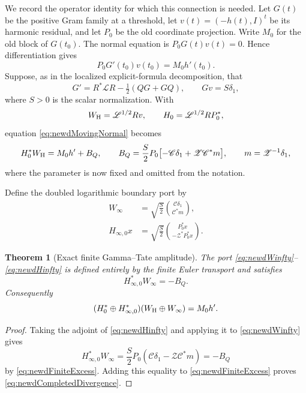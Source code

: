 \documentclass[11pt]{amsart}
\newtheorem{theorem}{Theorem}[section]
\theoremstyle{definition}
\theoremstyle{remark}
\begin{document}
We record the operator identity for which this connection is needed.  Let
$G(t)$ be the positive Gram family at a threshold, let
$v(t)=(-h(t),I)^t$ be its harmonic residual, and let $P_0$ be the old
coordinate projection.  Write $M_0$ for the old block of $G(t_0)$.  The
normal equation is $P_0G(t)v(t)=0$.  Hence differentiation gives
\begin{equation}\label{eq:newdMovingNormal}
 P_0G'(t_0)v(t_0)=M_0h'(t_0).
\end{equation}
Suppose, as in the localized explicit-formula decomposition, that
\[
 G'=R^*\mathscr LR-\tfrac12(QG+GQ),
 \qquad Gv=S\delta_1,
\]
where $S>0$ is the scalar normalization.  With
\[
 W_{\rm H}=\mathscr L^{1/2}Rv,
 \qquad H_0=\mathscr L^{1/2}RP_0^*,
\]
equation \eqref{eq:newdMovingNormal} becomes
\begin{equation}\label{eq:newdFiniteExcess}
 H_0^*W_{\rm H}=M_0h'+B_Q,
 \qquad
 B_Q=\frac S2P_0
 \bigl[-\mathscr C\delta_1+\mathscr Z\mathscr C^*m\bigr],
 \qquad m=\mathscr Z^{-1}\delta_1,
\end{equation}
where the parameter is now fixed and omitted from the notation.

Define the doubled logarithmic boundary port by
\begin{align}
 W_\infty
 &=\sqrt{\frac S2}
   \binom{\mathscr C\delta_1}{\mathscr C^*m},
   \label{eq:newdWinfty}\\
 H_{\infty,0}x
 &=\sqrt{\frac S2}
   \binom{P_0^*x}{-\mathscr Z^*P_0^*x}.
   \label{eq:newdHinfty}
\end{align}

\begin{theorem}[Exact finite Gamma--Tate amplitude]
\label{thm:newdAmplitude}
The port \eqref{eq:newdWinfty}--\eqref{eq:newdHinfty} is defined entirely
by the finite Euler transport and satisfies
\begin{equation}\label{eq:newdAmplitude}
 H_{\infty,0}^*W_\infty=-B_Q.
\end{equation}
Consequently
\begin{equation}\label{eq:newdCompletedDivergence}
 (H_0^*\oplus H_{\infty,0}^*)
 (W_{\rm H}\oplus W_\infty)=M_0h'.
\end{equation}
\end{theorem}

\begin{proof}
Taking the adjoint of \eqref{eq:newdHinfty} and applying it to
\eqref{eq:newdWinfty} gives
\[
 H_{\infty,0}^*W_\infty
 =\frac S2P_0
   (\mathscr C\delta_1-\mathscr Z\mathscr C^*m)
 =-B_Q
\]
by \eqref{eq:newdFiniteExcess}.  Adding this equality to
\eqref{eq:newdFiniteExcess} proves
\eqref{eq:newdCompletedDivergence}.
\end{proof}
\end{document}
